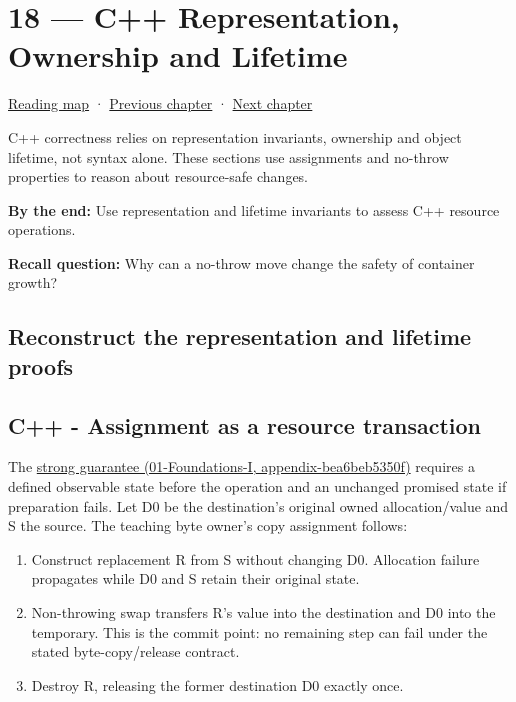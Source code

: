 \hypertarget{03-visual-computing-i-ch018}{}
\section{18 --- C++ Representation, Ownership and Lifetime}\label{c-representation-ownership-and-lifetime}

\href{Chapter\%20Edition/02\%20-\%20Graphics\%20Vision\%20and\%20XR/00\%20-\%20Reading\%20Map}{Reading map} · \hyperref[03-visual-computing-i-ch017]{Previous chapter} · \hyperref[03-visual-computing-i-ch019]{Next chapter}

C++ correctness relies on representation invariants, ownership and object lifetime, not syntax alone. These sections use assignments and no-throw properties to reason about resource-safe changes.

\textbf{By the end:} Use representation and lifetime invariants to assess C++ resource operations.

\textbf{Recall question:} Why can a no-throw move change the safety of container growth?

\subsection{Reconstruct the representation and lifetime proofs}\label{reconstruct-the-representation-and-lifetime-proofs}

\subsection{C++ - Assignment as a resource transaction}\label{c---assignment-as-a-resource-transaction}

The \href{}{strong guarantee (01-Foundations-I, appendix-bea6beb5350f)} requires a defined observable state before the operation and an unchanged promised state if preparation fails. Let D0 be the destination's original owned allocation/value and S the source. The teaching byte owner's copy assignment follows:

\begin{enumerate}
\def\labelenumi{\arabic{enumi}.}
\tightlist
\item
  Construct replacement R from S without changing D0. Allocation failure propagates while D0 and S retain their original state.
\item
  Non-throwing swap transfers R's value into the destination and D0 into the temporary. This is the commit point: no remaining step can fail under the stated byte-copy/release contract.
\item
  Destroy R, releasing the former destination D0 exactly once.
\end{enumerate}

